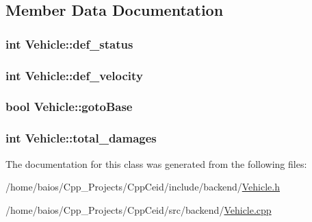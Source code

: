 \subsection{Member Data Documentation}
\hypertarget{class_vehicle_a18846d0cdc78a3f2137e70021af01492}{
\subsubsection[{def\-\_\-status}]{\setlength{\rightskip}{0pt plus 5cm}int Vehicle\-::def\-\_\-status}}\label{class_vehicle_a18846d0cdc78a3f2137e70021af01492}
\hypertarget{class_vehicle_a8ec5bc4761c8ab8b17a69d9a9e8c5d2c}{
\subsubsection[{def\-\_\-velocity}]{\setlength{\rightskip}{0pt plus 5cm}int Vehicle\-::def\-\_\-velocity}}\label{class_vehicle_a8ec5bc4761c8ab8b17a69d9a9e8c5d2c}
\hypertarget{class_vehicle_a0130974e6ab67f6a2b59772b5de4cc6e}{
\subsubsection[{goto\-Base}]{\setlength{\rightskip}{0pt plus 5cm}bool Vehicle\-::goto\-Base}}\label{class_vehicle_a0130974e6ab67f6a2b59772b5de4cc6e}
\hypertarget{class_vehicle_a9ff49e3ecf77a8b92fb3d48ccd08dba3}{
\subsubsection[{total\-\_\-damages}]{\setlength{\rightskip}{0pt plus 5cm}int Vehicle\-::total\-\_\-damages}}\label{class_vehicle_a9ff49e3ecf77a8b92fb3d48ccd08dba3}


The documentation for this class was generated from the following files\-:\begin{DoxyCompactItemize}
\item 
/home/baios/\-Cpp\-\_\-\-Projects/\-Cpp\-Ceid/include/backend/\hyperlink{_vehicle_8h}{Vehicle.\-h}\item 
/home/baios/\-Cpp\-\_\-\-Projects/\-Cpp\-Ceid/src/backend/\hyperlink{_vehicle_8cpp}{Vehicle.\-cpp}\end{DoxyCompactItemize}
